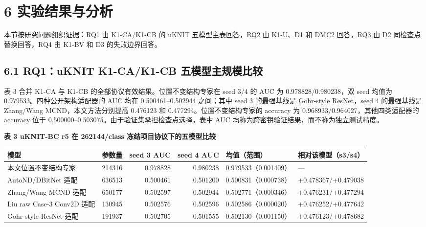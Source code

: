 \documentclass[
  a4paper,
  UTF8]{ctexart}
\begin{document}
\hypertarget{ux5b9eux9a8cux7ed3ux679cux4e0eux5206ux6790}{%
\section{6
实验结果与分析}\label{ux5b9eux9a8cux7ed3ux679cux4e0eux5206ux6790}}

本节按研究问题组织证据：RQ1 由 K1-CA/K1-CB 的 uKNIT
五模型主表回答，RQ2 由 K1-U、D1 和 DMC2 回答，RQ3 由 D2
同检查点替换回答，RQ4 由 K1-BV 和 D3 的失败边界回答。

\subsection{6.1 RQ1：uKNIT K1-CA/K1-CB 五模型主规模比较}

表 3 合并 K1-CA 与 K1-CB
的全部协议有效结果。位置不变结构专家在 seed 3/4 的 AUC 为
0.978828/0.980238，双 seed 均值为 0.979533。四种公开架构适配器的 AUC
均在 0.500461--0.502944 之间；其中 seed 3 的最强基线是 Gohr-style
ResNet，seed 4 的最强基线是 Zhang/Wang MCND，本文方法分别提高
0.476123 和 0.477294。位置不变结构专家的 accuracy 为
0.968933/0.964027，其他四类适配器的 accuracy 位于
0.500000--0.503075。由于验证集承担检查点选择，表中 AUC
均称为跨密钥验证结果，而不称为独立测试精度。

\textbf{表 3 uKNIT-BC r5 在 262144/class 冻结项目协议下的五模型比较}

\begingroup
\scriptsize
\setlength{\tabcolsep}{2.2pt}
\begin{longtable}[]{@{}p{}rrrp{}p{}@{}}
\toprule
模型 & 参数量 & seed 3 AUC & seed 4 AUC & 均值（范围） &
相对该模型（s3/s4）\tabularnewline
\midrule
\endhead
本文位置不变结构专家 & 214316 & 0.978828 & 0.980238 &
0.979533\newline（0.001409） & ---\tabularnewline
AutoND/DBitNet 适配 & 636513 & 0.500461 & 0.501200 &
0.500831\newline（0.000738） & +0.478367/\newline +0.479038\tabularnewline
Zhang/Wang MCND 适配 & 650177 & 0.502597 & 0.502944 &
0.502771\newline（0.000346） & +0.476231/\newline +0.477294\tabularnewline
Liu raw Case-3 Conv2D 适配 & 130945 & 0.502576 & 0.502596 &
0.502586\newline（0.000020） & +0.476252/\newline +0.477642\tabularnewline
Gohr-style ResNet 适配 & 191937 & 0.502705 & 0.501555 &
0.502130\newline（0.001150） & +0.476123/\newline +0.478682\tabularnewline
\bottomrule
\end{longtable}
\endgroup
\end{document}
